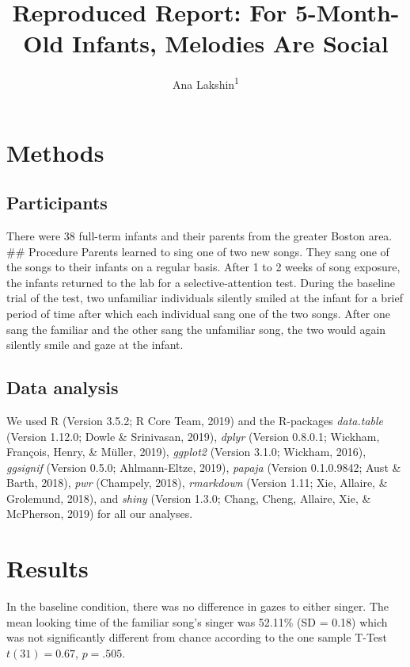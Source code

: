 \documentclass[man,floatsintext]{apa6}
\title{Reproduced Report: For 5-Month-Old Infants, Melodies Are Social}
\author{Ana Lakshin\textsuperscript{1}}
\date{}
\affiliation{
\vspace{0.5cm}
\textsuperscript{1} Brooklyn College}
\begin{document}
\maketitle

\section{Methods}\label{methods}

\subsection{Participants}\label{participants}

There were 38 full-term infants and their parents from the greater
Boston area. \#\# Procedure Parents learned to sing one of two new
songs. They sang one of the songs to their infants on a regular basis.
After 1 to 2 weeks of song exposure, the infants returned to the lab for
a selective-attention test. During the baseline trial of the test, two
unfamiliar individuals silently smiled at the infant for a brief period
of time after which each individual sang one of the two songs. After one
sang the familiar and the other sang the unfamiliar song, the two would
again silently smile and gaze at the infant.

\subsection{Data analysis}\label{data-analysis}

We used R (Version 3.5.2; R Core Team, 2019) and the R-packages
\emph{data.table} (Version 1.12.0; Dowle \& Srinivasan, 2019),
\emph{dplyr} (Version 0.8.0.1; Wickham, François, Henry, \& Müller,
2019), \emph{ggplot2} (Version 3.1.0; Wickham, 2016), \emph{ggsignif}
(Version 0.5.0; Ahlmann-Eltze, 2019), \emph{papaja} (Version 0.1.0.9842;
Aust \& Barth, 2018), \emph{pwr} (Champely, 2018), \emph{rmarkdown}
(Version 1.11; Xie, Allaire, \& Grolemund, 2018), and \emph{shiny}
(Version 1.3.0; Chang, Cheng, Allaire, Xie, \& McPherson, 2019) for all
our analyses.

\section{Results}\label{results}

In the baseline condition, there was no difference in gazes to either
singer. The mean looking time of the familiar song's singer was 52.11\%
(SD = 0.18) which was not significantly different from chance according
to the one sample T-Test \(t(31) = 0.67\), \(p = .505\).
\end{document}
